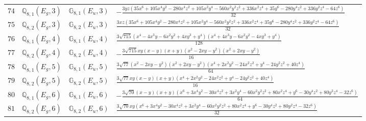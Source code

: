 \documentclass[fleqn,8pt,landscape]{jsarticle}
\begin{document}
\begin{table}[ht!]
\begin{center}
\begin{tabular}{cccl}
$ 74 $ & $ \mathbb{Q}_{8,1}(E_{g},3) $ & $ \mathbb{G}_{8,1}(E_{u},3) $ & $ - \frac{3 y z \left(35 x^{6} + 105 x^{4} y^{2} - 280 x^{4} z^{2} + 105 x^{2} y^{4} - 560 x^{2} y^{2} z^{2} + 336 x^{2} z^{4} + 35 y^{6} - 280 y^{4} z^{2} + 336 y^{2} z^{4} - 64 z^{6}\right)}{32} $ \\
$ 75 $ & $ \mathbb{Q}_{8,2}(E_{g},3) $ & $ \mathbb{G}_{8,2}(E_{u},3) $ & $ \frac{3 x z \left(35 x^{6} + 105 x^{4} y^{2} - 280 x^{4} z^{2} + 105 x^{2} y^{4} - 560 x^{2} y^{2} z^{2} + 336 x^{2} z^{4} + 35 y^{6} - 280 y^{4} z^{2} + 336 y^{2} z^{4} - 64 z^{6}\right)}{32} $ \\
$ 76 $ & $ \mathbb{Q}_{8,1}(E_{g},4) $ & $ \mathbb{G}_{8,1}(E_{u},4) $ & $ \frac{3 \sqrt{715} \left(x^{4} - 4 x^{3} y - 6 x^{2} y^{2} + 4 x y^{3} + y^{4}\right) \left(x^{4} + 4 x^{3} y - 6 x^{2} y^{2} - 4 x y^{3} + y^{4}\right)}{128} $ \\
$ 77 $ & $ \mathbb{Q}_{8,2}(E_{g},4) $ & $ \mathbb{G}_{8,2}(E_{u},4) $ & $ - \frac{3 \sqrt{715} x y \left(x - y\right) \left(x + y\right) \left(x^{2} - 2 x y - y^{2}\right) \left(x^{2} + 2 x y - y^{2}\right)}{16} $ \\
$ 78 $ & $ \mathbb{Q}_{8,1}(E_{g},5) $ & $ \mathbb{G}_{8,1}(E_{u},5) $ & $ \frac{3 \sqrt{77} \left(x^{2} - 2 x y - y^{2}\right) \left(x^{2} + 2 x y - y^{2}\right) \left(x^{4} + 2 x^{2} y^{2} - 24 x^{2} z^{2} + y^{4} - 24 y^{2} z^{2} + 40 z^{4}\right)}{64} $ \\
$ 79 $ & $ \mathbb{Q}_{8,2}(E_{g},5) $ & $ \mathbb{G}_{8,2}(E_{u},5) $ & $ \frac{3 \sqrt{77} x y \left(x - y\right) \left(x + y\right) \left(x^{4} + 2 x^{2} y^{2} - 24 x^{2} z^{2} + y^{4} - 24 y^{2} z^{2} + 40 z^{4}\right)}{16} $ \\
$ 80 $ & $ \mathbb{Q}_{8,1}(E_{g},6) $ & $ \mathbb{G}_{8,1}(E_{u},6) $ & $ - \frac{3 \sqrt{70} \left(x - y\right) \left(x + y\right) \left(x^{6} + 3 x^{4} y^{2} - 30 x^{4} z^{2} + 3 x^{2} y^{4} - 60 x^{2} y^{2} z^{2} + 80 x^{2} z^{4} + y^{6} - 30 y^{4} z^{2} + 80 y^{2} z^{4} - 32 z^{6}\right)}{64} $ \\
$ 81 $ & $ \mathbb{Q}_{8,2}(E_{g},6) $ & $ \mathbb{G}_{8,2}(E_{u},6) $ & $ \frac{3 \sqrt{70} x y \left(x^{6} + 3 x^{4} y^{2} - 30 x^{4} z^{2} + 3 x^{2} y^{4} - 60 x^{2} y^{2} z^{2} + 80 x^{2} z^{4} + y^{6} - 30 y^{4} z^{2} + 80 y^{2} z^{4} - 32 z^{6}\right)}{32} $ \\
 \hline \hline
\end{tabular}
\end{center}
\end{table}
\end{document}
